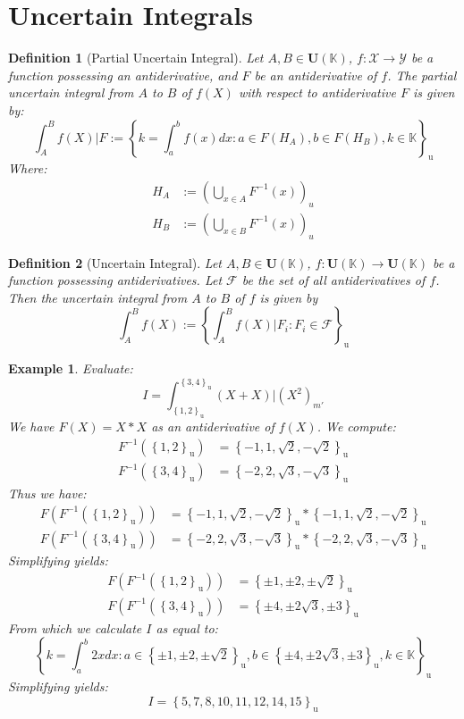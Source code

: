 \documentclass[a4paper,12pt, twoside]{memoir}
\newtheorem{definition}{Definition}[chapter]
\newtheorem{example}{Example}[chapter]
\newcommand{\set}[1]{\left\{#1\right\}} %
\newcommand{\s}[1]{\set{#1}_\mathrm{u}} %
\newcommand{\tsbd}[1]{\mathbf{U}(\mathbb{#1})}
\begin{document}
\section{Uncertain Integrals}

\begin{definition}[Partial Uncertain Integral]
	Let $A,B \in \tsbd{K}$, $f: \mathcal{X} \to \mathcal{Y}$ be a function possessing an antiderivative, and $F$ be an antiderivative of $f$. The partial uncertain integral from $A$ to $B$ of $f(X)$ with respect to antiderivative $F$ is given by:
	\[
		\int_{A}^{B}{f(X)|F} := \s{k = \int_{a}^{b}f(x)dx : a \in F(H_A), b \in F(H_B), k \in \mathbb{K}}
	\]
	Where:
	\begin{align*}
		H_A & := \left(\bigcup_{x \in A}{F^{-1}(x)}\right)_u \\
		H_B & := \left(\bigcup_{x \in B}{F^{-1}(x)}\right)_u
	\end{align*}
\end{definition}

\begin{definition}[Uncertain Integral]
	Let $A,B \in \tsbd{K}$, $f: \tsbd{K} \to \tsbd{K}$ be a function possessing antiderivatives. Let $\mathcal{F}$ be the set of all antiderivatives of $f$. Then the uncertain integral from $A$ to $B$ of $f$ is given by
	\[
		\int_{A}^{B}{f(X)} := \s{\int_{A}^{B}f(X)|F_i : F_i \in \mathcal{F}}
	\]
\end{definition}

\begin{example}
	Evaluate:
	\[I = \int_{\s{1,2}}^{\s{3,4}}{(X+X)|(X^2)_{m'}}\]
	We have $F(X) = X*X$ as an antiderivative of $f(X)$. We compute:
	\begin{align*}
		F^{-1}(\s{1,2}) & = \s{-1,1,\sqrt{2},-\sqrt{2}} \\
		F^{-1}(\s{3,4}) & = \s{-2,2,\sqrt{3},-\sqrt{3}}
	\end{align*}
	Thus we have:
	\begin{align*}
		F(F^{-1}(\s{1,2})) & = \s{-1,1,\sqrt{2},-\sqrt{2}} * \s{-1,1,\sqrt{2},-\sqrt{2}} \\
		F(F^{-1}(\s{3,4})) & = \s{-2,2,\sqrt{3},-\sqrt{3}} * \s{-2,2,\sqrt{3},-\sqrt{3}}
	\end{align*}
	Simplifying yields:
	\begin{align*}
		F(F^{-1}(\s{1,2})) & = \s{\pm 1, \pm 2, \pm \sqrt{2}}  \\
		F(F^{-1}(\s{3,4})) & = \s{\pm 4, \pm 2\sqrt{3}, \pm 3}
	\end{align*}
	From which we calculate $I$ as equal to:
	$$
		\s{k = \int_{a}^{b}{2xdx}: a \in \s{\pm 1, \pm 2, \pm \sqrt{2}}, b \in \s{\pm 4, \pm 2\sqrt{3}, \pm 3}, k \in \mathbb{K}}
	$$
	Simplifying yields:
	\[I = \s{5, 7, 8, 10, 11, 12, 14, 15}\]
\end{example}
\end{document}
